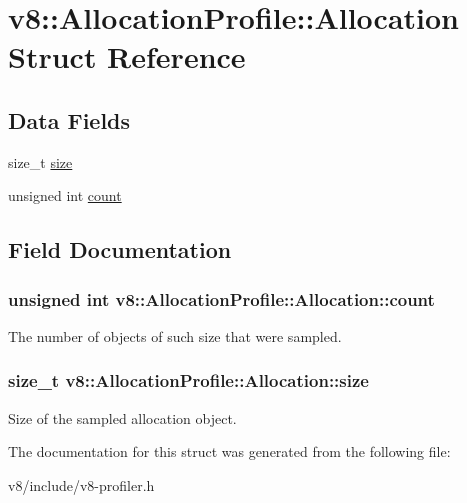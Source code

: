 \hypertarget{structv8_1_1AllocationProfile_1_1Allocation}{}\section{v8\+:\+:Allocation\+Profile\+:\+:Allocation Struct Reference}
\label{structv8_1_1AllocationProfile_1_1Allocation}
\subsection*{Data Fields}
\begin{DoxyCompactItemize}
\item 
size\+\_\+t \hyperlink{structv8_1_1AllocationProfile_1_1Allocation_a346410fa5dfb796dff396069897c0aba}{size}
\item 
unsigned int \hyperlink{structv8_1_1AllocationProfile_1_1Allocation_a012fe5238f5ebec039d7832f2d3ae8ed}{count}
\end{DoxyCompactItemize}


\subsection{Field Documentation}
\subsubsection[{\texorpdfstring{count}{count}}]{\setlength{\rightskip}{0pt plus 5cm}unsigned int v8\+::\+Allocation\+Profile\+::\+Allocation\+::count}\hypertarget{structv8_1_1AllocationProfile_1_1Allocation_a012fe5238f5ebec039d7832f2d3ae8ed}{}\label{structv8_1_1AllocationProfile_1_1Allocation_a012fe5238f5ebec039d7832f2d3ae8ed}
The number of objects of such size that were sampled. 
\subsubsection[{\texorpdfstring{size}{size}}]{\setlength{\rightskip}{0pt plus 5cm}size\+\_\+t v8\+::\+Allocation\+Profile\+::\+Allocation\+::size}\hypertarget{structv8_1_1AllocationProfile_1_1Allocation_a346410fa5dfb796dff396069897c0aba}{}\label{structv8_1_1AllocationProfile_1_1Allocation_a346410fa5dfb796dff396069897c0aba}
Size of the sampled allocation object. 

The documentation for this struct was generated from the following file\+:\begin{DoxyCompactItemize}
\item 
v8/include/v8-\/profiler.\+h\end{DoxyCompactItemize}
